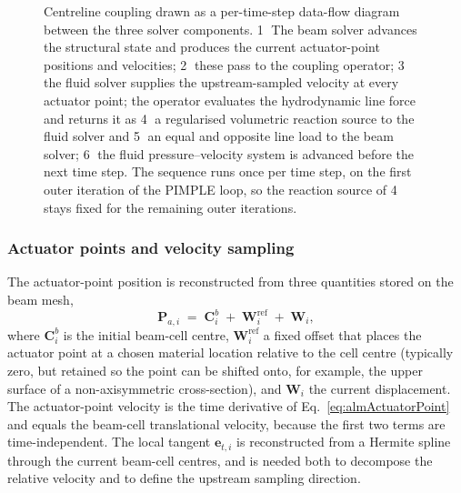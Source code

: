 \begin{figure}[!ht]
{
}
\caption{Centreline coupling drawn as a per-time-step data-flow diagram between the three solver components. \protect\textcircled{1} The beam solver advances the structural state and produces the current actuator-point positions and velocities; \protect\textcircled{2} these pass to the coupling operator; \protect\textcircled{3} the fluid solver supplies the upstream-sampled velocity at every actuator point; the operator evaluates the hydrodynamic line force and returns it as \protect\textcircled{4} a regularised volumetric reaction source to the fluid solver and \protect\textcircled{5} an equal and opposite line load to the beam solver; \protect\textcircled{6} the fluid pressure--velocity system is advanced before the next time step. The sequence runs once per time step, on the first outer iteration of the PIMPLE loop, so the reaction source of \protect\textcircled{4} stays fixed for the remaining outer iterations.}
\label{fig:almCouplingSchematic}
\end{figure}

\subsubsection{Actuator points and velocity sampling}
\label{sec:almSampling}
The actuator-point position is reconstructed from three quantities stored on the beam mesh,
\begin{equation}
\mathbf{P}_{a,i}
\;=\;
\mathbf{C}^{b}_{i}
\;+\;
\mathbf{W}^{\mathrm{ref}}_{i}
\;+\;
\mathbf{W}_{i},
\label{eq:almActuatorPoint}
\end{equation}
where $\mathbf{C}^{b}_{i}$ is the initial beam-cell centre, $\mathbf{W}^{\mathrm{ref}}_{i}$ a fixed offset that places the actuator point at a chosen material location relative to the cell centre (typically zero, but retained so the point can be shifted onto, for example, the upper surface of a non-axisymmetric cross-section), and $\mathbf{W}_{i}$ the current displacement. The actuator-point velocity is the time derivative of Eq.~\eqref{eq:almActuatorPoint} and equals the beam-cell translational velocity, because the first two terms are time-independent. The local tangent $\mathbf{e}_{t,i}$ is reconstructed from a Hermite spline through the current beam-cell centres, and is needed both to decompose the relative velocity and to define the upstream sampling direction.

